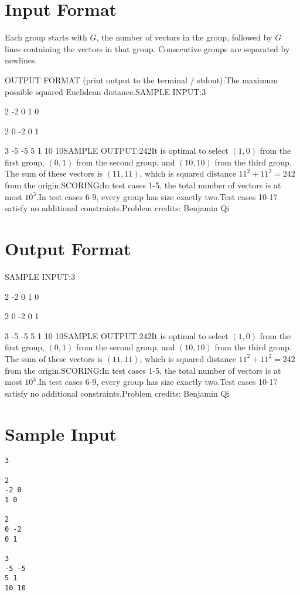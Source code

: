 \documentclass[12pt]{article}
\begin{document}
\section*{Input Format}
Each group starts with $G$, the number of vectors in the group, followed by $G$
lines containing the vectors in that group. Consecutive groups are separated by
newlines.

OUTPUT FORMAT (print output to the terminal / stdout):The maximum possible squared Euclidean distance.SAMPLE INPUT:3

2
-2 0
1 0

2
0 -2
0 1

3
-5 -5
5 1
10 10SAMPLE OUTPUT:242It is optimal to select $(1,0)$ from the first group, $(0,1)$ from the second
group, and $(10,10)$ from the third group. The sum of these vectors is
$(11,11)$, which is squared distance $11^2+11^2=242$ from the origin.SCORING:In test cases 1-5, the total number of vectors is at most $10^3$.In test cases 6-9, every group has size exactly two.Test cases 10-17 satisfy no additional constraints.Problem credits: Benjamin Qi

\section*{Output Format}
SAMPLE INPUT:3

2
-2 0
1 0

2
0 -2
0 1

3
-5 -5
5 1
10 10SAMPLE OUTPUT:242It is optimal to select $(1,0)$ from the first group, $(0,1)$ from the second
group, and $(10,10)$ from the third group. The sum of these vectors is
$(11,11)$, which is squared distance $11^2+11^2=242$ from the origin.SCORING:In test cases 1-5, the total number of vectors is at most $10^3$.In test cases 6-9, every group has size exactly two.Test cases 10-17 satisfy no additional constraints.Problem credits: Benjamin Qi

\section*{Sample Input}
\begin{verbatim}
3

2
-2 0
1 0

2
0 -2
0 1

3
-5 -5
5 1
10 10
\end{verbatim}
\end{document}
